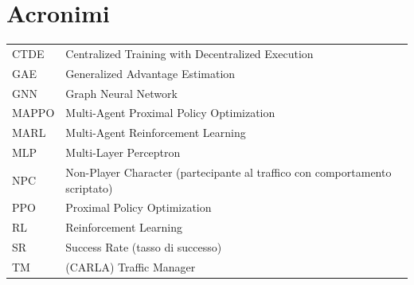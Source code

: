 \documentclass[12pt,a4paper,oneside]{report}
\begin{document}
\chapter*{Acronimi}
\noindent\begin{tabular}{@{}l@{\hspace{1.5em}}%
  >{\raggedright\arraybackslash}p{}@{}}
CTDE  & Centralized Training with Decentralized Execution \\
GAE   & Generalized Advantage Estimation \\
GNN   & Graph Neural Network \\
MAPPO & Multi-Agent Proximal Policy Optimization \\
MARL  & Multi-Agent Reinforcement Learning \\
MLP   & Multi-Layer Perceptron \\
NPC   & Non-Player Character (partecipante al traffico con comportamento scriptato) \\
PPO   & Proximal Policy Optimization \\
RL    & Reinforcement Learning \\
SR    & Success Rate (tasso di successo) \\
TM    & (CARLA) Traffic Manager \\
\end{tabular}

\clearpage
{}











\appendix


\printbibliography[heading=bibintoc]
\end{document}
